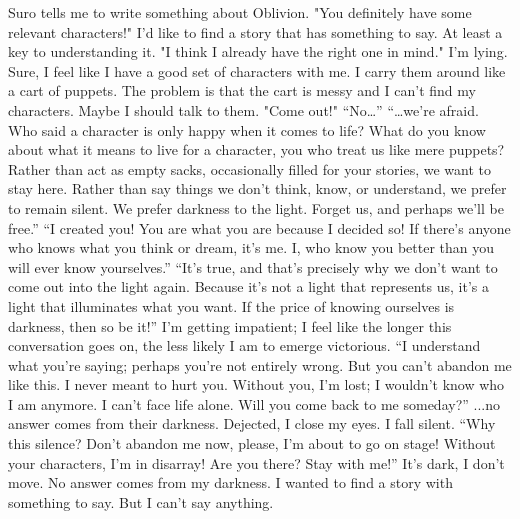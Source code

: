 {}{Suro tells me to write something about Oblivion.
"You definitely have some relevant characters!"
I'd like to find a story that has something to say. At least a key to understanding it.
"I think I already have the right one in mind."
I'm lying. Sure, I feel like I have a good set of characters with me. I carry them around like a cart of puppets. The problem is that the cart is messy and I can't find my characters. Maybe I should talk to them.
"Come out!"
“No…”
“…we're afraid. Who said a character is only happy when it comes to life? What do you know about what it means to live for a character, you who treat us like mere puppets? Rather than act as empty sacks, occasionally filled for your stories, we want to stay here. Rather than say things we don't think, know, or understand, we prefer to remain silent. We prefer darkness to the light. Forget us, and perhaps we'll be free.”
“I created you! You are what you are because I decided so! If there's anyone who knows what you think or dream, it's me. I, who know you better than you will ever know yourselves.”
“It's true, and that's precisely why we don't want to come out into the light again. Because it's not a light that represents us, it's a light that illuminates what you want. If the price of knowing ourselves is darkness, then so be it!”
I'm getting impatient; I feel like the longer this conversation goes on, the less likely I am to emerge victorious.
“I understand what you're saying; perhaps you're not entirely wrong. But you can't abandon me like this. I never meant to hurt you. Without you, I'm lost; I wouldn't know who I am anymore. I can't face life alone. Will you come back to me someday?”
...no answer comes from their darkness. Dejected, I close my eyes. I fall silent.
“Why this silence? Don't abandon me now, please, I'm about to go on stage! Without your characters, I'm in disarray! Are you there? Stay with me!”
It's dark, I don't move. No answer comes from my darkness. I wanted to find a story with something to say. But I can't say anything.}

